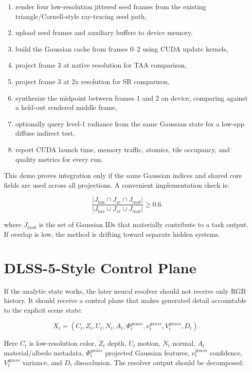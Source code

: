 \documentclass[11pt]{article}
\begin{document}
\begin{enumerate}
  \item render four low-resolution jittered seed frames from the existing
        triangle/Cornell-style ray-tracing seed path,
  \item upload seed frames and auxiliary buffers to device memory,
  \item build the Gaussian cache from frames 0--2 using CUDA update kernels,
  \item project frame 3 at native resolution for TAA comparison,
  \item project frame 3 at 2x resolution for SR comparison,
  \item synthesize the midpoint between frames 1 and 2 on device, comparing
        against a held-out rendered middle frame,
  \item optionally query level-1 radiance from the same Gaussian state for a
        low-spp diffuse indirect test,
  \item report CUDA launch time, memory traffic, atomics, tile occupancy, and
        quality metrics for every run.
\end{enumerate}

This demo proves integration only if the same Gaussian indices and shared core
fields are used across all projections. A convenient implementation check is:

\[
  \frac{|J_{taa}\cap J_{sr}\cap J_{mot}|}
       {|J_{taa}\cup J_{sr}\cup J_{mot}|}
  \geq 0.6
\]

where $J_{task}$ is the set of Gaussian IDs that materially contribute to a
task output. If overlap is low, the method is drifting toward separate hidden
systems.

\section{DLSS-5-Style Control Plane}

If the analytic state works, the later neural resolver should not receive only
RGB history. It should receive a control plane that makes generated detail
accountable to the explicit scene state:

\[
  X_t =
  (C_t, Z_t, U_t, N_t, A_t,
   \Phi_t^{gauss}, \nu_t^{gauss}, V_t^{gauss}, D_t).
\]

Here $C_t$ is low-resolution color, $Z_t$ depth, $U_t$ motion, $N_t$ normal,
$A_t$ material/albedo metadata, $\Phi_t^{gauss}$ projected Gaussian features,
$\nu_t^{gauss}$ confidence, $V_t^{gauss}$ variance, and $D_t$ disocclusion.
The resolver output should be decomposed:
\end{document}
